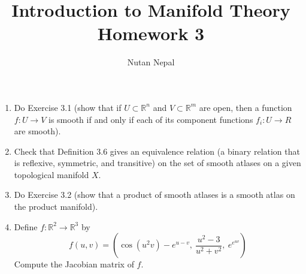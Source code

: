 \documentclass[12pt]{article}
\title{\textbf{Introduction to Manifold Theory} \\
\large Homework 3
}
\author{Nutan Nepal}
\newcommand{\rl}{\mathbb{R}}
\begin{document}
\maketitle
\makebox[\linewidth]{\rule{200mm}{1pt}}
\vspace{1mm}

\begin{enumerate}

\item Do Exercise 3.1 (show that if
    $U\subset \rl^n$ and $V\subset \rl^m$
    are open, then a function $f:U\to V$
    is smooth if
    and only if each of its component
    functions $f_i : U\to R$ are smooth).

\begin{mybox}

    \vspace*{15mm}
\end{mybox}


\item Check that Definition 3.6 gives an
    equivalence relation (a binary relation
    that is reflexive, symmetric,
    and transitive) on the set of smooth
    atlases on a given topological manifold
    $X$.
 
\begin{mybox}

    \vspace*{15mm}
\end{mybox}
 
 
\item Do Exercise 3.2 (show that a product
    of smooth atlases is a smooth atlas on
    the product manifold).

\begin{mybox}

    \vspace*{15mm}
\end{mybox}

\item Define $f:\rl^2\to\rl^3$ by
$$f(u,v) =\left(\cos(u^2v)-e^{u-v},\ 
    \frac{u^2-3}{u^2+v^2},\ e^{e^{uv}}\right)$$
Compute the Jacobian matrix of $f$.
        
\begin{mybox}

    \vspace*{15mm}
\end{mybox}

\end{enumerate}
\end{document}
